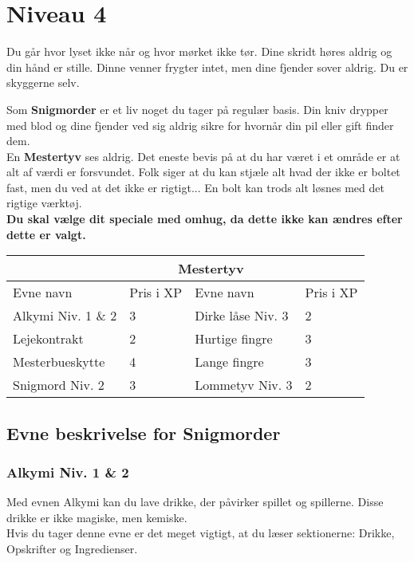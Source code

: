 \chapter*{Niveau 4}

Du går hvor lyset ikke når og hvor mørket ikke tør. Dine skridt høres aldrig og din hånd er stille. Dinne venner frygter intet, men dine fjender sover aldrig. Du er skyggerne selv.


Som \textbf{Snigmorder} er et liv noget du tager på regulær basis. Din kniv drypper med blod og dine fjender ved sig aldrig sikre for hvornår din pil eller gift finder dem.\\

En \textbf{Mestertyv} ses aldrig. Det eneste bevis på at du har været i et område er at alt af værdi er forsvundet. Folk siger at du kan stjæle alt hvad der ikke er boltet fast, men du ved at det ikke er rigtigt... En bolt kan trods alt løsnes med det rigtige værktøj.\\

\textbf{Du skal vælge dit speciale med omhug, da dette ikke kan ændres efter dette er valgt.}\\

\begin{tabular}{|p{}|p{}|p{}|p{}|}
\hline
\rowcolor{cerulean!80}
 \multicolumn{2}{|c|}{  Snigmorder } & \multicolumn{2}{|c|}{ Mestertyv }\\
\hline
\rowcolor{cerulean!40}
    Evne navn & Pris i XP & Evne navn & Pris i XP\\ \hline
    Alkymi Niv. 1 \& 2 & 3 & Dirke låse Niv. 3 & 2 \\ \hline
    Lejekontrakt & 2 & Hurtige fingre & 3\\\hline
    Mesterbueskytte & 4 & Lange fingre & 3\\\hline
    Snigmord Niv. 2 & 3 & Lommetyv Niv. 3 & 2\\
\hline
\end{tabular}

\section*{Evne beskrivelse for Snigmorder}

\subsection*{Alkymi Niv. 1 \& 2}
Med evnen Alkymi kan du lave drikke, der påvirker spillet og spillerne. Disse drikke er ikke magiske, men kemiske.\\
Hvis du tager denne evne er det meget vigtigt, at du læser sektionerne: Drikke, Opskrifter og Ingredienser.

